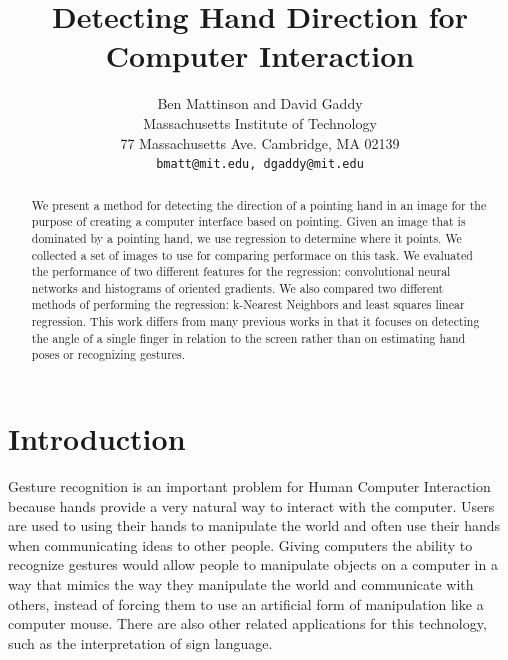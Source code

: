 \documentclass[10pt,twocolumn,letterpaper]{article}
\begin{document}
\title{Detecting Hand Direction for Computer Interaction}

\author{Ben Mattinson and David Gaddy\\
Massachusetts Institute of Technology\\
77 Massachusetts Ave. Cambridge, MA 02139\\
{\tt\small bmatt@mit.edu, dgaddy@mit.edu}
}

\maketitle

\begin{abstract}
We present a method for detecting the direction of a pointing hand in an image for the purpose of creating a computer interface based on pointing.  Given an image that is dominated by a pointing hand, we use regression to determine where it points.  We collected a set of images to use for comparing performace on this task.  We evaluated the performance of two different features for the regression: convolutional neural networks and histograms of oriented gradients.  We also compared two different methods of performing the regression: k-Nearest Neighbors and least squares linear regression.  This work differs from many previous works in that it focuses on detecting the angle of a single finger in relation to the screen rather than on estimating hand poses or recognizing gestures.

\end{abstract}

\section{Introduction}

Gesture recognition is an important problem for Human Computer Interaction because hands provide a very natural way to interact with the computer. Users are used to using their hands to manipulate the world and often use their hands when communicating ideas to other people. Giving computers the ability to recognize gestures would allow people to manipulate objects on a computer in a way that mimics the way they manipulate the world and communicate with others, instead of forcing them to use an artificial form of manipulation like a computer mouse. There are also other related applications for this technology, such as the interpretation of sign language.
\end{document}
